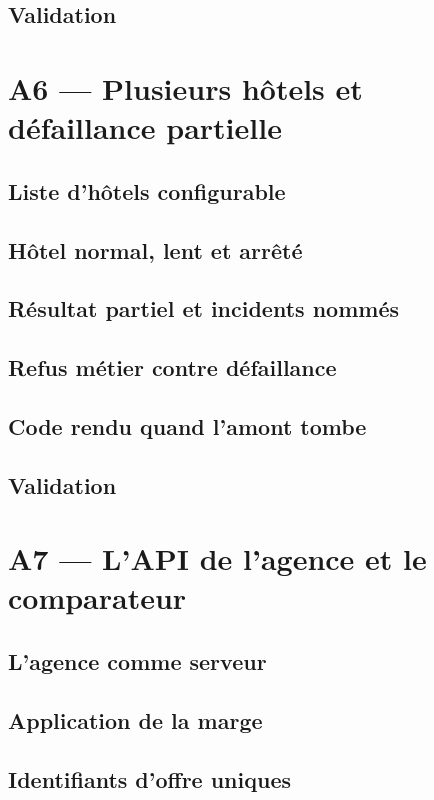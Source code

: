 \documentclass[11pt,a4paper]{report}
\begin{document}
\section{Validation}

\chapter{A6 --- Plusieurs hôtels et défaillance partielle}
\section{Liste d'hôtels configurable}
\section{Hôtel normal, lent et arrêté}
\section{Résultat partiel et incidents nommés}
\section{Refus métier contre défaillance}
\section{Code rendu quand l'amont tombe}
\section{Validation}

\chapter{A7 --- L'API de l'agence et le comparateur}
\section{L'agence comme serveur}
\section{Application de la marge}
\section{Identifiants d'offre uniques}
\end{document}
